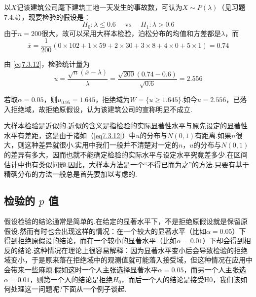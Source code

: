 \begin{solution}
	以$X$记该建筑公司麾下建筑工地一天发生的事故数，可认为$X\sim P(\lambda)$（见习题 7.4.4），现要检验的假设是：
	\[H _ { 0 } : \lambda \leq 0.6 \quad \text { vs } \quad H _ { 1 } : \lambda > 0.6\]
	由于$n=200$很大，故可以采用大样本检验，泊松分布的均值和方差都是$\lambda$，而
	\[\overline { x } = \frac { 1 } { 200 } ( 0 \times 102 + 1 \times 59 + 2 \times 30 + 3 \times 8 + 4 \times 0 + 5 \times 1 )=0.74\]
	
	由 \eqref{eq7.3.12}，检验统计量为
	\[u = \frac { \sqrt { n } ( \overline { x } - \lambda ) } { \lambda } = \frac { \sqrt { 200 } ( 0.74 - 0.6 ) } { \sqrt { 0.6 } } = 2.556\]

	若取$\alpha=0.05$，则$u_{0.95}=1.645$，拒绝域为$W=\{u\geq 1.645\}$.如今$u=
	2.556$，已落入拒绝域，故拒绝原假设，认为该建筑公司的宣称明显不成立.
	
	大样本检验是近似的.近似的含义是指检验的实际显著性水平与原先设定的显著性水平有差距，这是由于诸如（\ref{eq7.3.12}）中$u$的分布与$N(0,1)$有距离.如果$n$很大，则这种差异就很小.实用中我们一般并不清楚对一定的$n$，$u$的分布与$N(0,1)$的差异有多大，因而也就不能确定检验的实际水平与设定水平究竟差多少.在区间估计中也有类似问题.因此，大样本方法是一个“不得已而为之”的方法.只要有基于精确分布的方法一般总是首先要加以考虑的.
\end{solution}
\subsection{检验的 $p$ 值\label{sec:7.3.4}}
假设检验的结论通常是简单的.在给定的显著水平下，不是拒绝原假设就是保留原假设.然而有时也会出现这样的情况：在一个较大的显著水平（比如$\alpha=
0.05$）下得到拒绝原假设的结论，而在一个较小的显著水平（比如$\alpha=
0.01$）下却会得到相反的结论.这种情况在理论上很容易解释：因为显著水平变小后会导致检验的拒绝域变小，于是原来落在拒绝域中的观测值就可能落入接受域，但这种情况在应用中会带来一些麻烦.假如这时一个人主张选择显著水平$\alpha=
0.05$，而另一个人主张选$\alpha=
0.01$，则第一个人的结论是拒绝$H_{0}$，而后一个人的结论是接受H0，我们该如何处理这一问题呢?下面从一个例子谈起.

